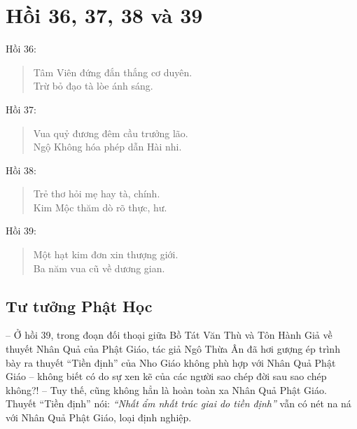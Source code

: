 \chapter{Hồi 36, 37, 38 và 39} %
\label{cha:hoi_36_37}

Hồi 36:

\begin{verse}
\begin{itshape}
Tâm Viên đứng đắn thắng cơ duyên.\\
Trừ bỏ đạo tà lòe ánh sáng.
\end{itshape}
\end{verse}

Hồi 37:

\begin{verse}
\begin{itshape}
Vua quỷ đương đêm cầu trưởng lão.\\
Ngộ Không hóa phép dẫn Hài nhi.
\end{itshape}
\end{verse}

Hồi 38:

\begin{verse}
\begin{itshape}
Trẻ thơ hỏi mẹ hay tà, chính.\\
Kim Mộc thăm dò rõ thực, hư.
\end{itshape}
\end{verse}

Hồi 39:

\begin{verse}
\begin{itshape}
Một hạt kim đơn xin thượng giới.\\
Ba năm vua cũ về dương gian.
\end{itshape}
\end{verse}

\section{Tư tưởng Phật Học} %
\label{sec:36_37_phat_hoc}

-- Ở hồi 39, trong đoạn đối thoại giữa Bồ Tát Văn Thù và Tôn Hành Giả về thuyết Nhân Quả của Phật Giáo, tác giả Ngô Thừa Ân đã hơi gượng ép trình bày ra thuyết ``Tiền định'' của Nho Giáo không phù hợp với Nhân Quả Phật Giáo -- không biết có do sự xen kẽ của các người sao chép đời sau sao chép không?! -- Tuy thế, cũng không hẳn là hoàn toàn xa Nhân Quả Phật Giáo. Thuyết ``Tiền định'' nói: \emph{``Nhất ẩm nhất trác giai do tiền định''} vẫn có nét na ná với Nhân Quả Phật Giáo, loại định nghiệp.

